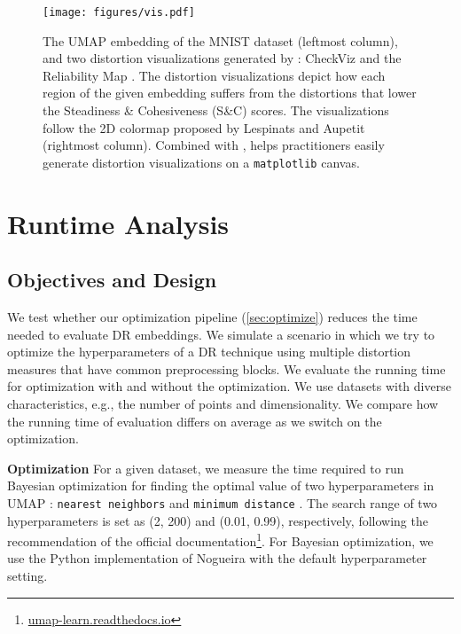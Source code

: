 
\begin{figure*}
    \centering
    \texttt{[image: figures/vis.pdf]}
    \vspace{-6mm}
    \caption{
    The UMAP embedding of the MNIST dataset (leftmost column), and two distortion visualizations generated by \vislib: CheckViz \cite{lespinats11cgf} and the Reliability Map \cite{jeon21tvcg}. 
    The distortion visualizations depict how each region of the given embedding suffers from the distortions that lower the Steadiness \& Cohesiveness (S\&C) scores. The visualizations follow the 2D colormap proposed by Lespinats and Aupetit \cite{lespinats11cgf} (rightmost column).
    Combined with \library, \vislib helps practitioners easily generate distortion visualizations on a \texttt{matplotlib} canvas. \vspace{-4mm}}
    \label{fig:distvis}
\end{figure*}


\section{Runtime Analysis}

\label{sec:runtime}

\subsection{Objectives and Design}

We test whether our optimization pipeline (\autoref{sec:optimize}) reduces the time needed to evaluate DR embeddings.
We simulate a scenario in which we try to optimize the hyperparameters of a DR technique using multiple distortion measures that have common preprocessing blocks.
We evaluate the running time for optimization with and without the optimization. 
We use datasets with diverse characteristics, e.g., the number of points and dimensionality. We compare how the running time of evaluation differs on average as we switch on the optimization. 


\noindent
\textbf{Optimization}
For a given dataset, we measure the time required to run Bayesian optimization \cite{snoek12nips} for finding the optimal value of two hyperparameters in UMAP \cite{mcinnes2020arxiv}: \texttt{nearest neighbors} and \texttt{minimum distance} \cite{mcinnes2020arxiv}. The search range of two hyperparameters is set as (2, 200) and (0.01, 0.99), respectively, following the recommendation of the official documentation\footnote{\href{https://umap-learn.readthedocs.io/en/latest/index.html}{umap-learn.readthedocs.io}}.
For Bayesian optimization, we use the Python implementation of Nogueira \cite{nogueira14github} with the default hyperparameter setting.

